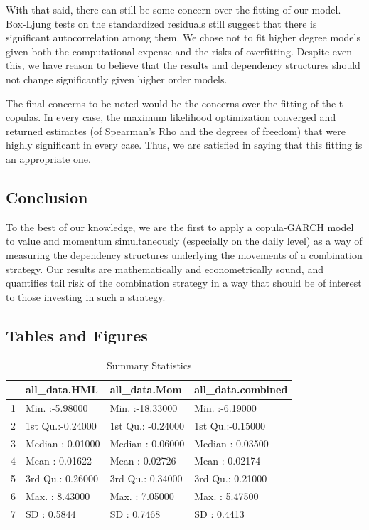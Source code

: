\documentclass[12pt,letterpaper]{memoir}
\begin{document}
With that said, there can still be some concern over the fitting of our model. Box-Ljung tests on the standardized residuals still suggest that there is significant autocorrelation among them. We chose not to fit higher degree models given both the computational expense and the risks of overfitting. Despite even this, we have reason to believe that the results and dependency structures should not change significantly given higher order models. 

The final concerns to be noted would be the concerns over the fitting of the t-copulas. In every case, the maximum likelihood optimization converged and returned estimates (of Spearman's Rho and the degrees of freedom) that were highly significant in every case. Thus, we are satisfied in saying that this fitting is an appropriate one.
\subsection*{Conclusion}
To the best of our knowledge, we are the first to apply a copula-GARCH model to value and momentum simultaneously (especially on the daily level) as a way of measuring the dependency structures underlying the movements of a combination strategy. Our results are mathematically and econometrically sound, and quantifies tail risk of the combination strategy in a way that should be of interest to those investing in such a strategy.
\newpage
\subsection*{Tables and Figures}
\begin{table}[ht]
\centering
\caption{Summary Statistics}
\begin{tabular}{rlll}
  \hline
 &  all\_data.HML &  all\_data.Mom & all\_data.combined \\ 
  \hline
1 & Min.   :-5.98000   & Min.   :-18.33000   & Min.   :-6.19000   \\ 
  2 & 1st Qu.:-0.24000   & 1st Qu.: -0.24000   & 1st Qu.:-0.15000   \\ 
  3 & Median : 0.01000   & Median :  0.06000   & Median : 0.03500   \\ 
  4 & Mean   : 0.01622   & Mean   :  0.02726   & Mean   : 0.02174   \\ 
  5 & 3rd Qu.: 0.26000   & 3rd Qu.:  0.34000   & 3rd Qu.: 0.21000   \\ 
  6 & Max.   : 8.43000   & Max.   :  7.05000   & Max.   : 5.47500   \\
  7 & SD     : 0.5844    & SD     :  0.7468    & SD     : 0.4413     \\
   \hline
\end{tabular}
\end{table}
\end{document}

